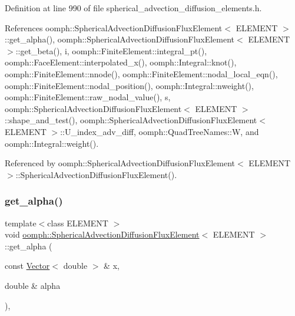 Definition at line 990 of file spherical\+\_\+advection\+\_\+diffusion\+\_\+elements.\+h.



References oomph\+::\+Spherical\+Advection\+Diffusion\+Flux\+Element$<$ E\+L\+E\+M\+E\+N\+T $>$\+::get\+\_\+alpha(), oomph\+::\+Spherical\+Advection\+Diffusion\+Flux\+Element$<$ E\+L\+E\+M\+E\+N\+T $>$\+::get\+\_\+beta(), i, oomph\+::\+Finite\+Element\+::integral\+\_\+pt(), oomph\+::\+Face\+Element\+::interpolated\+\_\+x(), oomph\+::\+Integral\+::knot(), oomph\+::\+Finite\+Element\+::nnode(), oomph\+::\+Finite\+Element\+::nodal\+\_\+local\+\_\+eqn(), oomph\+::\+Finite\+Element\+::nodal\+\_\+position(), oomph\+::\+Integral\+::nweight(), oomph\+::\+Finite\+Element\+::raw\+\_\+nodal\+\_\+value(), s, oomph\+::\+Spherical\+Advection\+Diffusion\+Flux\+Element$<$ E\+L\+E\+M\+E\+N\+T $>$\+::shape\+\_\+and\+\_\+test(), oomph\+::\+Spherical\+Advection\+Diffusion\+Flux\+Element$<$ E\+L\+E\+M\+E\+N\+T $>$\+::\+U\+\_\+index\+\_\+adv\+\_\+diff, oomph\+::\+Quad\+Tree\+Names\+::W, and oomph\+::\+Integral\+::weight().



Referenced by oomph\+::\+Spherical\+Advection\+Diffusion\+Flux\+Element$<$ E\+L\+E\+M\+E\+N\+T $>$\+::\+Spherical\+Advection\+Diffusion\+Flux\+Element().

\mbox{\label{classoomph_1_1SphericalAdvectionDiffusionFluxElement_a1e3a162c505bc7719da00e30f8c6cb58}} 
\subsubsection{\texorpdfstring{get\+\_\+alpha()}{get\_alpha()}}
{\footnotesize\ttfamily template$<$class E\+L\+E\+M\+E\+NT $>$ \\
void \hyperlink{classoomph_1_1SphericalAdvectionDiffusionFluxElement}{oomph\+::\+Spherical\+Advection\+Diffusion\+Flux\+Element}$<$ E\+L\+E\+M\+E\+NT $>$\+::get\+\_\+alpha (\begin{DoxyParamCaption}\item[{const \hyperlink{classoomph_1_1Vector}{Vector}$<$ double $>$ \&}]{x,  }\item[{double \&}]{alpha }\end{DoxyParamCaption})\hspace{0.3cm}{\ttfamily [inline]}, {\ttfamily [protected]}}



